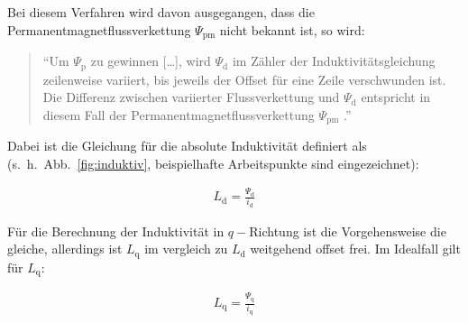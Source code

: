\documentclass[conference,twocolumn]{IEEEtran}
\newcommand{\x}[1]{\mathrm{#1}}
\begin{document}
Bei diesem Verfahren wird davon ausgegangen, dass die Permanentmagnetflussverkettung $\Psi_\x{pm}$ nicht bekannt ist, so wird:

\begin{quote}
\enquote{Um $\Psi_\x{p}$ zu gewinnen [\ldots], wird $\Psi_\x{d}$ im Zähler der Induktivitätsgleichung zeilenweise variiert, bis jeweils der Offset für eine Zeile verschwunden
ist. Die Differenz zwischen variierter Flussverkettung und $\Psi_\x{d}$ entspricht in diesem Fall der Permanentmagnetflussverkettung $\Psi_\x{pm}$ \autocite[S.~109]{Kellner2012}.}
\end{quote}

Dabei ist die Gleichung für die absolute Induktivität definiert als (s.~h.~Abb.~\ref{fig:induktiv}, beispielhafte Arbeitspunkte sind eingezeichnet):

\begin{align}
L_\x{d} = \frac{\Psi_\x{d}}{i_\x{d}}
\end{align}

Für die Berechnung der Induktivität in $q-$Richtung ist die Vorgehensweise die gleiche, allerdings ist $L_\x{q}$ im vergleich zu $L_\x{d}$ weitgehend offset frei.
Im Idealfall gilt für $L_\x{q}$:

\begin{align}
L_\x{q} = \frac{\Psi_\x{q}}{i_\x{q}}
\end{align}




\end{document}
